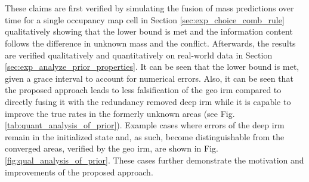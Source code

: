 \\\\
These claims are first verified by simulating the fusion of mass predictions over time for a single occupancy map cell in Section \ref{sec:exp_choice_comb_rule} qualitatively showing that the lower bound is met and the information content follows the difference in unknown mass and the conflict. Afterwards, the results are verified qualitatively and quantitatively on real-world data in Section \ref{sec:exp_analyze_prior_properties}. It can be seen that the lower bound is met, given a grace interval to account for numerical errors. Also, it can be seen that the proposed approach leads to less falsification of the geo \gls{irm} compared to directly fusing it with the redundancy removed deep \gls{irm} while it is capable to improve the true rates in the formerly unknown areas (see Fig. \ref{tab:quant_analysis_of_prior}). Example cases where errors of the deep \gls{irm} remain in the initialized state and, as such, become distinguishable from the converged areas, verified by the geo \gls{irm}, are shown in Fig. \ref{fig:qual_analysis_of_prior}. These cases further demonstrate the motivation and improvements of the proposed approach.